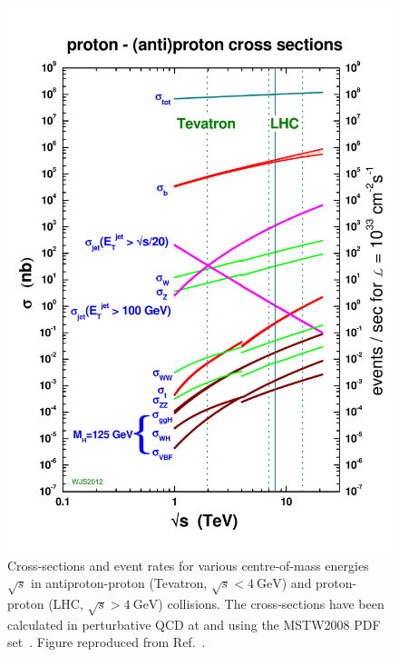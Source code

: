 \begin{figure}[htbp]
    \centering
    \includegraphics[width=.95\textwidth]{figures/protoncollisions/crosssections2012_v5.pdf}
    \caption{Cross-sections and event rates for various centre-of-mass energies \(\sqrt{s}\) in antiproton-proton (Tevatron, \(\sqrt{s} < \SI{4}{\giga\electronvolt}\)) and proton-proton (LHC, \(\sqrt{s} > \SI{4}{\giga\electronvolt}\)) collisions. The cross-sections have been calculated in perturbative QCD at \NLO and \NNLO using the MSTW2008 PDF set~\cite{Martin2009}. Figure reproduced from Ref.~\cite{Stirling2012}.}
    \label{fig:pp:crosssections:overview}
\end{figure}


